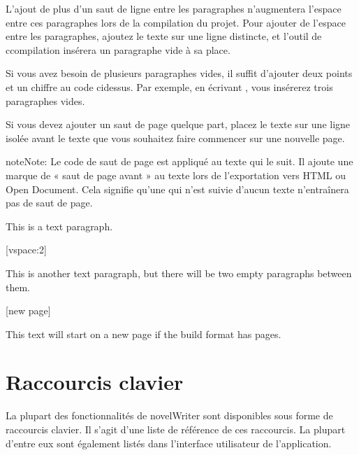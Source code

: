 \documentclass[a4paper,11pt,french]{sphinxmanual}
\begin{document}
\sphinxAtStartPar
L’ajout de plus d’un saut de ligne entre les paragraphes n’augmentera  l’espace entre ces paragraphes lors de la compilation du projet. Pour ajouter de l’espace entre les paragraphes, ajoutez le texte \sphinxcode{\sphinxupquote{{[}vspace{]}}} sur une ligne distincte, et l’outil de ccompilation insérera un paragraphe vide à sa place.

\sphinxAtStartPar
Si vous avez besoin de plusieurs paragraphes vides, il suffit d’ajouter deux points et un chiffre au code ci\sphinxhyphen{}dessus. Par exemple, en écrivant \sphinxcode{\sphinxupquote{{[}vspace:3{]}}}, vous insérerez trois paragraphes vides.

\sphinxAtStartPar
Si vous devez ajouter un saut de page quelque part, placez le texte  sur une ligne isolée avant le texte que vous souhaitez faire commencer sur une nouvelle page.

\begin{sphinxadmonition}{note}{Note:}
\sphinxAtStartPar
Le code de saut de page est appliqué au texte qui le suit. Il ajoute une marque de « saut de page avant » au texte lors de l’exportation vers HTML ou Open Document. Cela signifie qu’une  qui n’est suivie d’aucun texte n’entraînera pas de saut de page.
\end{sphinxadmonition}

\sphinxAtStartPar
{}

\begin{sphinxVerbatim}[commandchars=\\\{\}]
This is a text paragraph.

[vspace:2]

This is another text paragraph, but there will be two empty paragraphs
between them.

[new page]

This text will start on a new page if the build format has pages.
\end{sphinxVerbatim}

\sphinxstepscope


\chapter{Raccourcis clavier}
\label{\detokenize{usage_shortcuts:keyboard-shortcuts}}\label{\detokenize{usage_shortcuts:a-kb}}\label{\detokenize{usage_shortcuts::doc}}
\sphinxAtStartPar
La plupart des fonctionnalités de novelWriter sont disponibles sous forme de raccourcis clavier. Il s’agit d’une liste de référence de ces raccourcis. La plupart d’entre eux sont également listés dans l’interface utilisateur de l’application.
\end{document}
